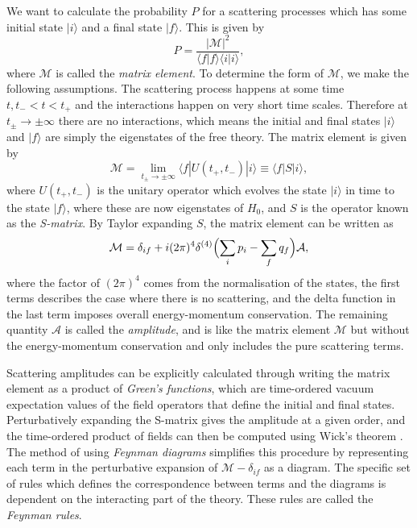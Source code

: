 We want to calculate the probability $P$ for a scattering processes which has some initial state $|i\rangle$ and a final state $|f\rangle$. This is given by
\begin{equation}\label{eq:pint}
   P=\frac{|\mathcal{M}|^2}{\langle f|f\rangle\langle i|i\rangle},
\end{equation}
where $\mathcal{M}$ is called the \textit{matrix element}. To determine the form of $\mathcal{M}$, we make the following assumptions. The scattering process happens at some time $t, t_-<t<t_+$ and the interactions happen on very short time scales. Therefore at $t_{\pm}\rightarrow\pm\infty$ there are no interactions, which means the initial and final states $|i\rangle$ and $|f\rangle$ are simply the eigenstates of the free theory. The matrix element is given by
\begin{equation}
    \mathcal{M}=\lim_{t_{\pm}\rightarrow\pm\infty}\langle f|U(t_+,t_-)|i\rangle\equiv\langle f|S|i\rangle,
\end{equation}
where $U(t_+,t_-)$ is the unitary operator which evolves the state $|i\rangle$ in time to the state $|f\rangle$, where these are now eigenstates of $H_0$, and $S$ is the operator known as the \textit{S-matrix}. By Taylor expanding $S$, the matrix element can be written as
\begin{equation}
    \mathcal{M}=\delta_{if}+i(2\pi)^4\delta^{(4)}\Bigl(\sum_ip_i-\sum_fq_f\Bigr)\mathcal{A},
\end{equation}
where the factor of $(2\pi)^4$ comes from the normalisation of the states, the first terms describes the case where there is no scattering, and the delta function in the last term imposes overall energy-momentum conservation. The remaining quantity $\mathcal{A}$ is called the \textit{amplitude}, and is like the matrix element $\mathcal{M}$ but without the energy-momentum conservation and only includes the pure scattering terms. 

Scattering amplitudes can be explicitly calculated through writing the matrix element as a product of \textit{Green's functions}, which are time-ordered vacuum expectation values of the field operators that define the initial and final states. Perturbatively expanding the S-matrix gives the amplitude at a given order, and the time-ordered product of fields can then be computed using Wick's theorem \cite{Theory:PeskinSchroeder}. The method of using \textit{Feynman diagrams} simplifies this procedure by representing each term in the perturbative expansion of $\mathcal{M}-\delta_{if}$ as a diagram. The specific set of rules which defines the correspondence between terms and the diagrams is dependent on the interacting part of the theory. These rules are called the \textit{Feynman rules}.

